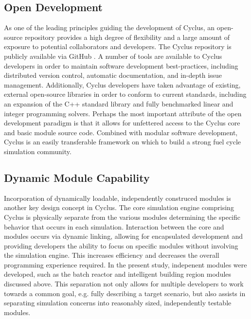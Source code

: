 \documentclass{anstrans}
\begin{document}
\subsection{Open Development}
As one of the leading principles guiding the development of Cyclus, an open-source repository provides a high degree of flexibility 
and a large amount of exposure to potential collaborators and developers. The Cyclus repository is publicly available via 
GitHub \cite{cyclus2012}. A number of tools are available to Cyclus developers in order to maintain software development best-practices, 
including distributed version control, automatic documentation, and in-depth issue management. Additionally, Cyclus developers have taken 
advantage of existing, external open-source libraries in order to conform to current standards, including an expansion of the C++ standard
library and fully benchmarked linear and integer programming solvers. Perhaps the most important attribute of the open development paradigm 
is that it allows for unfettered access to the Cyclus core and basic module source code. Combined with modular software development, Cyclus 
is an easily transferable framework on which to build a strong fuel cycle simulation community.
\subsection{Dynamic Module Capability}
Incorporation of dynamically loadable, independently construced modules is another key design concept in Cyclus. The core simulation engine 
comprising Cyclus is physically separate from the various modules determining the specific behavior that occurs in each simulation. 
Interaction between the core and modules occurs via dynamic linking, allowing for encapsulated development and providing developers the ability 
to focus on specific modules without involving the simulation engine. This increases efficiency and decreases the overall programming experience 
required. In the present study, indepenent modules were developed, such as the batch reactor and intelligent building region modules discussed 
above. This separation not only allows for multiple developers to work towards a common goal, e.g. fully describing a target scenario, but
also assists in separating simulation concerns into reasonably sized, independently testable modules.
\end{document}
